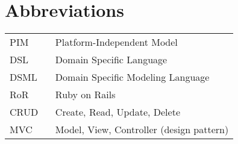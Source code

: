 \chapter*{Abbreviations}

\begin{flushleft}
\begin{tabular}{l p{0.8\linewidth}}
PIM       & Platform-Independent Model\\
DSL       & Domain Specific Language\\
DSML      & Domain Specific Modeling Language\\
RoR       & Ruby on Rails\\
CRUD      & Create, Read, Update, Delete\\
MVC       & Model, View, Controller (design pattern)\\
\end{tabular}
\end{flushleft}

